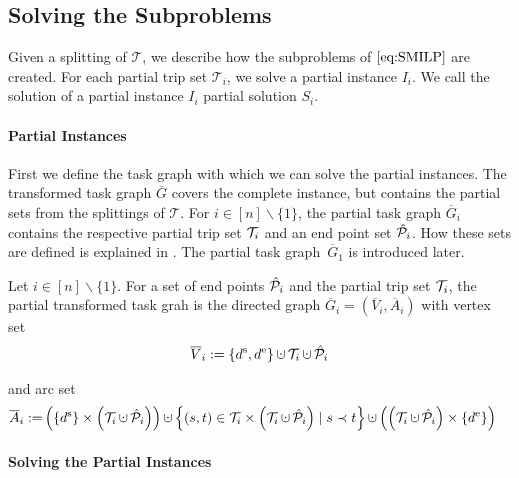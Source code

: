 
\subsection{Solving the Subproblems}

Given a splitting of $\mathcal{T}$, we describe how the subproblems of $\eqref{eq:SMILP}$ are created. For each partial trip set $\mathcal{T}_i$, we solve a partial instance $I_i$. We call the solution of a partial instance $I_i$ partial solution $S_i$. 

\paragraph{Partial Instances} \parfill

First we define the task graph with which we can solve the partial instances. The transformed task graph $\overline{G}$ covers the complete instance, but contains the partial sets from the splittings of $\mathcal{T}$. For ${i\in[n]\backslash\{1\}}$, the partial task graph $\overline{G}_i$ contains the respective partial trip set $\mathcal{T}_i$ and an end point set $\hat{\mathcal{P}}_i$. How these sets are defined is explained in . The partial task graph~$\overline{G}_1$ is introduced later.

\begin{definition}

Let ${i\in[n]\backslash\{1\}}$. For a set of end points $\hat{\mathcal{P}}_i$ and the partial trip set $\mathcal{T}_i$, the partial transformed task grah is the directed graph ${\overline{G}_i=\left(\overline{V}_i,\overline{A}_i\right)}$ with vertex set
\begin{align*}
	\overline{V}_i := \left\{\ds,\de\right\}\cupdot\Ti\cupdot\Phat_i
\end{align*}

and arc set
\begin{align*}
	\overline{A}_i := & \left(\left\{\ds\right\}\times\left(\Ti\cupdot\Phat_i\right)\right)\cupdot\left\{(s,t)\in\Ti\times\left(\Ti\cupdot\Phat_i\right)\mid s\prec t\right\} \cupdot\left(\left(\Ti\cupdot\Phat_i\right)\times\left\{\de\right\}\right)
\end{align*}

\end{definition}

\paragraph{Solving the Partial Instances} \parfill

